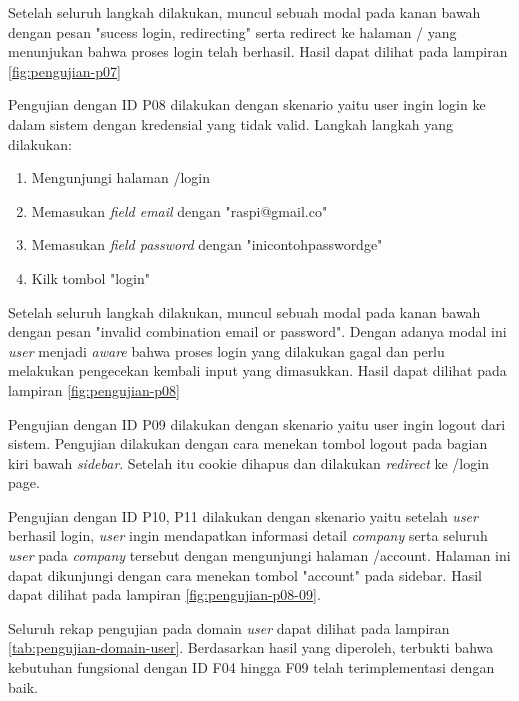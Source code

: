 Setelah seluruh langkah dilakukan, muncul sebuah modal pada kanan bawah dengan pesan "sucess login, redirecting" serta redirect ke halaman / yang menunjukan bahwa proses login telah berhasil. Hasil dapat dilihat pada lampiran \ref{fig:pengujian-p07}

Pengujian dengan ID P08 dilakukan dengan skenario yaitu user ingin login ke dalam sistem dengan kredensial yang tidak valid. Langkah langkah yang dilakukan:

\begin{enumerate}
  \item Mengunjungi halaman /login
  \item Memasukan \textit{field email} dengan "raspi@gmail.co"
  \item Memasukan \textit{field password} dengan "inicontohpasswordge"
  \item Kilk tombol "login"
\end{enumerate}

Setelah seluruh langkah dilakukan, muncul sebuah modal pada kanan bawah dengan pesan "invalid combination email or password". Dengan adanya modal ini \textit{user} menjadi \textit{aware} bahwa proses login yang dilakukan gagal dan perlu melakukan pengecekan kembali input yang dimasukkan. Hasil dapat dilihat pada lampiran \ref{fig:pengujian-p08}

Pengujian dengan ID P09 dilakukan dengan skenario yaitu user ingin logout dari sistem. Pengujian dilakukan dengan cara menekan tombol logout pada bagian kiri bawah \textit{sidebar}. Setelah itu cookie dihapus dan dilakukan \textit{redirect} ke /login page.

Pengujian dengan ID P10, P11 dilakukan dengan skenario yaitu setelah \textit{user} berhasil login, \textit{user} ingin mendapatkan informasi detail \textit{company} serta seluruh \textit{user} pada \textit{company} tersebut dengan mengunjungi halaman /account. Halaman ini dapat dikunjungi dengan cara menekan tombol "account" pada sidebar. Hasil dapat dilihat pada lampiran \ref{fig:pengujian-p08-09}.

Seluruh rekap pengujian pada domain \textit{user} dapat dilihat pada lampiran \ref{tab:pengujian-domain-user}. Berdasarkan hasil yang diperoleh, terbukti bahwa kebutuhan fungsional dengan ID F04 hingga F09 telah terimplementasi dengan baik.
